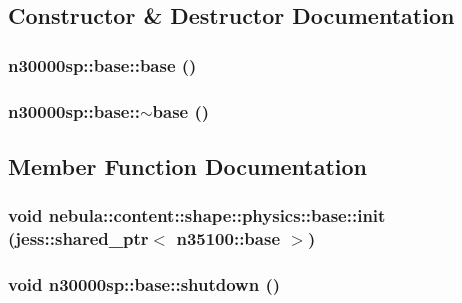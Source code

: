 \subsection{Constructor \& Destructor Documentation}
\hypertarget{classnebula_1_1content_1_1shape_1_1physics_1_1base_aa6da1dcb39a3e7f79b0f4deebec4833a}{
\subsubsection[{base}]{\setlength{\rightskip}{0pt plus 5cm}n30000sp::base::base ()}}
\label{classnebula_1_1content_1_1shape_1_1physics_1_1base_aa6da1dcb39a3e7f79b0f4deebec4833a}
\hypertarget{classnebula_1_1content_1_1shape_1_1physics_1_1base_a0ca110f2a34175df9231c1554031a6c9}{
\subsubsection[{$\sim$base}]{\setlength{\rightskip}{0pt plus 5cm}n30000sp::base::$\sim$base ()}}
\label{classnebula_1_1content_1_1shape_1_1physics_1_1base_a0ca110f2a34175df9231c1554031a6c9}


\subsection{Member Function Documentation}
\hypertarget{classnebula_1_1content_1_1shape_1_1physics_1_1base_a466f07124cdfc851e4cdd0ec54b86330}{
\subsubsection[{init}]{\setlength{\rightskip}{0pt plus 5cm}void nebula::content::shape::physics::base::init (jess::shared\_\-ptr$<$ {\bf n35100::base} $>$)}}
\label{classnebula_1_1content_1_1shape_1_1physics_1_1base_a466f07124cdfc851e4cdd0ec54b86330}
\hypertarget{classnebula_1_1content_1_1shape_1_1physics_1_1base_a78d06b0deed793d88b08baeb60f18665}{
\subsubsection[{shutdown}]{\setlength{\rightskip}{0pt plus 5cm}void n30000sp::base::shutdown ()}}
\label{classnebula_1_1content_1_1shape_1_1physics_1_1base_a78d06b0deed793d88b08baeb60f18665}


